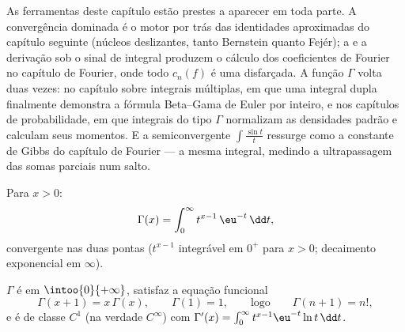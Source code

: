 \begin{remark}
As ferramentas deste capítulo estão prestes a aparecer em toda parte. A convergência
dominada é o motor por trás das identidades aproximadas do
capítulo seguinte (núcleos deslizantes, tanto Bernstein quanto Fejér);
a  e a derivação sob o sinal de integral
produzem o cálculo dos coeficientes de Fourier no capítulo de
Fourier, onde todo $c_n(f)$ é uma 
disfarçada. A função $\Gamma$ volta duas vezes: no capítulo
sobre integrais múltiplas, em que uma integral dupla finalmente demonstra
a fórmula Beta--Gama de Euler por inteiro, e nos capítulos de probabilidade,
em que integrais do tipo $\Gamma$ normalizam as densidades
padrão e calculam seus momentos. E a semiconvergente
$\int\frac{\sin t}{t}$ ressurge como a constante de Gibbs do
capítulo de Fourier --- a mesma integral, medindo a ultrapassagem
das somas parciais num salto.
\end{remark}

\begin{definition}\label{def:b2:integration:gamma}
Para $x > 0$:
\[
\Gamma(x) = \int_0^{\infty} t^{x-1}\,\eu^{-t}\,\dd t ,
\]
convergente nas duas pontas ($t^{x-1}$ integrável em $0^+$ para $x > 0$;
decaimento exponencial em $\infty$).
\end{definition}

\begin{theorem}\label{thm:b2:integration:gammaprops}
$\Gamma$ é  em $\intoo{0}{+\infty}$, satisfaz a
equação funcional
\[
\Gamma(x + 1) = x\,\Gamma(x),
\qquad \Gamma(1) = 1,
\qquad\text{logo}\qquad \Gamma(n + 1) = n! ,
\]
e é de classe $C^1$ (na verdade $C^\infty$) com $\Gamma'(x) =
\int_0^\infty t^{x-1}\eu^{-t}\ln t\,\dd t$.
\end{theorem}

